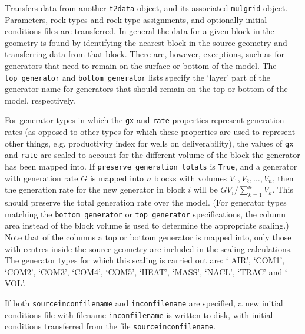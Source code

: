 Transfers data from another \texttt{t2data} object, and its associated \texttt{mulgrid} object.  Parameters, rock types and rock type assignments, and optionally initial conditions files are transferred.  In general the data for a given block in the geometry is found by identifying the nearest block in the source geometry and transferring data from that block.  There are, however, exceptions, such as for generators that need to remain on the surface or bottom of the model.  The \texttt{top\_generator} and \texttt{bottom\_generator} lists specify the `layer' part of the generator name for generators that should remain on the top or bottom of the model, respectively.

For generator types in which the \texttt{gx} and \texttt{rate} properties represent generation rates (as opposed to other types for which these properties are used to represent other things, e.g. productivity index for wells on deliverability), the values of \texttt{gx} and \texttt{rate} are scaled to account for the different volume of the block the generator has been mapped into.  If \texttt{preserve\_generation\_totals} is \texttt{True}, and a generator with generation rate $G$ is mapped into $n$ blocks with volumes $V_1, V_2,\ldots, V_n$, then the generation rate for the new generator in block $i$ will be $G V_i/\sum_{k=1}^{n}{V_k}$.  This should preserve the total generation rate over the model.  (For generator types matching the \texttt{bottom\_generator} or \texttt{top\_generator} specifications, the column area instead of the block volume is used to determine the appropriate scaling.)  Note that of the columns a top or bottom generator is mapped into, only those with centres inside the source geometry are included in the scaling calculations.  The generator types for which this scaling is carried out are: ` AIR', `COM1', `COM2', `COM3', `COM4', `COM5', `HEAT', `MASS', `NACL', `TRAC'  and ` VOL'.

If both \texttt{sourceinconfilename} and \texttt{inconfilename} are specified, a new initial conditions file with filename \texttt{inconfilename} is written to disk, with initial conditions transferred from the file \texttt{sourceinconfilename}.


